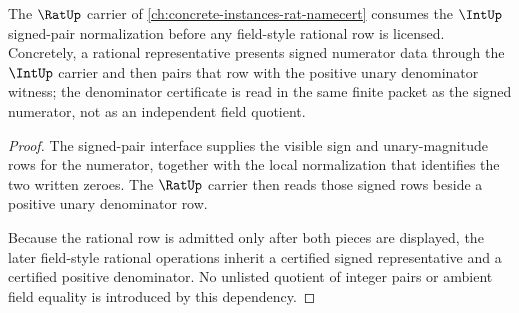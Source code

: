 \begin{lemma}
\label{lem:int-rat-signed-denominator-dependency}
The $\RatUp$ carrier of \autoref{ch:concrete-instances-rat-namecert} consumes
the $\IntUp$ signed-pair normalization before any field-style rational row is
licensed. Concretely, a rational representative presents signed numerator
data through the $\IntUp$ carrier and then pairs that row with the positive
unary denominator witness; the denominator certificate is read in the same
finite packet as the signed numerator, not as an independent field quotient.
\end{lemma}
\begin{proof}
The signed-pair interface supplies the visible sign and unary-magnitude rows
for the numerator, together with the local normalization that identifies the
two written zeroes. The $\RatUp$ carrier then reads those signed rows beside a
positive unary denominator row.

Because the rational row is admitted only after both pieces are displayed, the
later field-style rational operations inherit a certified signed
representative and a certified positive denominator. No unlisted quotient of
integer pairs or ambient field equality is introduced by this dependency.
\end{proof}
